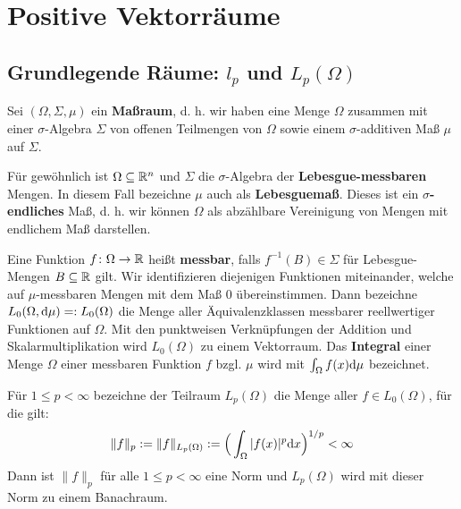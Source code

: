 
\chapter{Positive Vektorräume}

\section{Grundlegende Räume: $l_p$ und $L_p(\Omega)$}

\par


Sei $(\Omega, \Sigma,\mu)$ ein \textbf{Maßraum}, d. h. wir haben eine Menge $\Omega$ zusammen mit einer $\sigma$-Algebra $\Sigma$ von offenen Teilmengen von $\Omega$ sowie einem $\sigma$-additiven Maß $\mu$ auf $\Sigma$. 

\par
Für gewöhnlich ist $\Omega\subseteq \mathbb{R}^n$ und $\Sigma$ die $\sigma$-Algebra der \textbf{Lebesgue-messbaren} Mengen. In diesem Fall bezeichne $\mu$ auch als \textbf{Lebesguemaß}. Dieses ist ein \textbf{$\sigma$-endliches} Maß, d. h. wir können $\Omega$ als abzählbare Vereinigung von Mengen mit endlichem Maß darstellen.

\par
Eine Funktion $f\colon\Omega\to \mathbb{R}$ heißt \textbf{messbar}, falls $f^{-1}(B)\in\Sigma$ für Lebesgue-Mengen $B\subseteq \mathbb{R}$ gilt. Wir identifizieren diejenigen Funktionen miteinander, welche auf $\mu$-messbaren Mengen mit dem Maß $0$ übereinstimmen. Dann bezeichne $L_0(\Omega, \textnormal{d}\mu)=:L_0(\Omega)$ die Menge aller Äquivalenzklassen messbarer reellwertiger Funktionen auf $\Omega$. Mit den punktweisen Verknüpfungen der Addition und Skalarmultiplikation wird $L_0(\Omega)$ zu einem Vektorraum. Das \textbf{Integral} einer Menge $\Omega$ einer messbaren Funktion $f$ bzgl. $\mu$ wird mit $\int_\Omega f(x)\textnormal d\mu$ bezeichnet.

\par
Für $1\leq p< \infty$ bezeichne der Teilraum $L_p(\Omega)$ die Menge aller $f\in L_0(\Omega)$, für die gilt:
\begin{equation*}
\|f\|_p:=\|f\|_{L_p(\Omega)}:=\Big(\int_\Omega |f(x)|^p\textnormal dx\Big)^{1/p}<\infty
\end{equation*}
Dann ist $\|f\|_p$ für alle $1\leq p< \infty$ eine Norm und $L_p(\Omega)$ wird mit dieser Norm zu einem Banachraum. 

